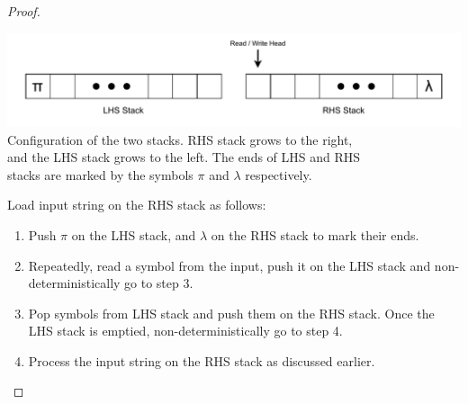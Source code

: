 \documentclass[11pt]{article}
\begin{document}
\begin{proof}
\begin{center}
\includegraphics[scale=1.0]{Figures/Problem3.9.pdf} \\
Configuration of the two stacks. RHS stack grows to the right, \\ and the LHS stack grows to the left. The ends of LHS and RHS \\ stacks are marked by the symbols $\pi$ and $\lambda$ respectively.
\end{center}

Load input string on the RHS stack as follows:
\begin{enumerate}
\item Push $\pi$ on the LHS stack, and $\lambda$ on the RHS stack to mark their ends.
\item Repeatedly, read a symbol from the input, push it on the LHS stack and non-deterministically go to step 3.
\item Pop symbols from LHS stack and push them on the RHS stack. Once the LHS stack is emptied, non-deterministically go to step 4.
\item Process the input string on the RHS stack as discussed earlier.
\end{enumerate}
\end{proof}
\end{document}

